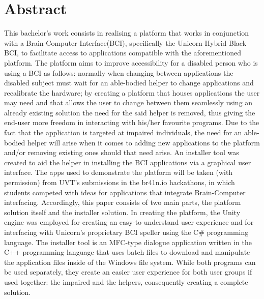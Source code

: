 \chapter*{Abstract}\label{cap:abstract_en}
This bachelor's work consists in realising a platform that works in conjunction with a Brain-Computer Interface(BCI), specifically the Unicorn Hybrid Black BCI\cite{Unicorn_Technology}, to facilitate access to applications compatible with the aforementioned platform. The platform aims to improve accessibility for a disabled person who is using a BCI as follows: normally when changing between applications the disabled subject must wait for an able-bodied helper to change applications and recalibrate the hardware; by creating a platform that houses applications the user may need and that allows the user to change between them seamlessly using an already existing solution\cite{Unicorn_Speller} the need for the said helper is removed, thus giving the end-user more freedom in interacting with his/her favourite programs. 
\vspace{\baselineskip}\newline
Due to the fact that the application is targeted at impaired individuals, the need for an able-bodied helper will arise when it comes to adding new applications to the platform and/or removing existing ones should that need arise. An installer tool was created to aid the helper in installing the BCI applications via a graphical user interface. The apps used to demonstrate the platform will be taken (with permission) from UVT's submissions in the br41n.io hackathons, in which students competed with ideas for applications that integrate Brain-Computer interfacing.
\vspace{\baselineskip}\newline
Accordingly, this paper consists of two main parts, the platform solution itself and the installer solution. In creating the platform, the Unity engine was employed for creating an easy-to-understand user experience and for interfacing with Unicorn's proprietary BCI speller\cite{Unicorn_Speller} using the C\# programming language. The installer tool is an MFC-type dialogue application written in the C++ programming language that uses batch files to download and manipulate the application files inside of the Windows file system. While both programs can be used separately, they create an easier user experience for both user groups if used together: the impaired and the helpers, consequently creating a complete solution.
